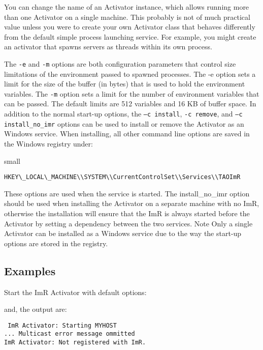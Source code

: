 You can change the name of an Activator instance, which allows running more than one Activator on a
single machine. This probably is not of much practical value unless you were to create your own Activator
class that behaves differently from the default simple process launching service. For example, you might
create an activator that spawns servers as threads within its own process.

The {\tt -e} and {\tt -m} options are both configuration parameters that control size limitations of the
environment passed to spawned processes. The -e option sets a limit for the size of the buffer (in bytes)
that is used to hold the environment variables. The {\tt -m} option sets a limit for the number of
environment variables that can be passed. The default limits are 512 variables and 16 KB of buffer space.
In addition to the normal start-up options, the {\tt –c install}, {\tt -c remove}, and {\tt –c install\_no\_imr}
options can be used to install or remove the Activator as an Windows service. When installing, all other
command line options are saved in the Windows registry under:

small{
\begin{verbatim}
HKEY\_LOCAL\_MACHINE\\SYSTEM\\CurrentControlSet\\Services\\TAOImR
\end{verbatim}
}

These options are used when the service is started. The install\_no\_imr option should be used when
installing the Activator on a separate machine with no ImR, otherwise the installation will ensure that
 the ImR is always started before the Activator by setting a dependency between the two services.
Note Only a single Activator can be installed as a Windows service due to the way the start-up options
are stored in the registry.

\subsection{Examples}

Start the ImR Activator with default options:


and, the output are:

\begin{verbatim}
 ImR Activator: Starting MYHOST
... Multicast error message ommitted
ImR Activator: Not registered with ImR.
 \end{verbatim}

